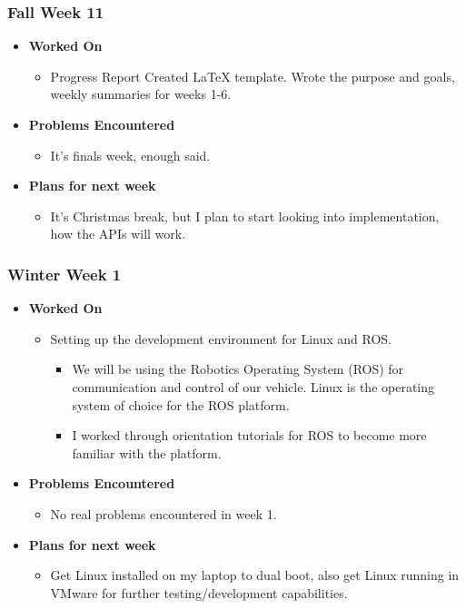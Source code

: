 \documentclass[compsoc,draftclsnofoot,onecolumn,10pt]{IEEEtran}
\begin{document}
\subsubsection{Fall Week 11}
\begin{itemize}
    \item {\textbf{Worked On}}
    \begin{itemize}
        \item Progress Report
        Created LaTeX template.
        Wrote the purpose and goals, weekly summaries for weeks 1-6.
    \end{itemize}

    \item {\textbf{Problems Encountered}}
    \begin{itemize}
        \item It's finals week, enough said.
    \end{itemize}

    \item{\textbf{Plans for next week}}
    \begin{itemize}
        \item It's Christmas break, but I plan to start looking into implementation, how the APIs will work.
    \end{itemize}
\end{itemize}

\subsubsection{Winter Week 1}
\begin{itemize}
    \item {\textbf{Worked On}}
    \begin{itemize}
        \item Setting up the development environment for Linux and ROS.
        \begin{itemize}
            \item We will be using the Robotics Operating System (ROS) for communication and control of our vehicle. Linux is the operating system of choice for the ROS platform.
            \item I worked through orientation tutorials for ROS to become more familiar with the platform.
        \end{itemize}
    \end{itemize}

    \item {\textbf{Problems Encountered}}
    \begin{itemize}
        \item No real problems encountered in week 1.
    \end{itemize}

    \item{\textbf{Plans for next week}}
    \begin{itemize}
        \item Get Linux installed on my laptop to dual boot, also get Linux running in VMware for further testing/development capabilities.
    \end{itemize}
\end{itemize}
\end{document}
